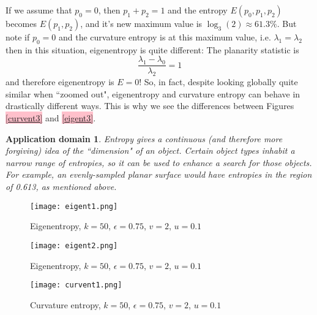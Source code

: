 \documentclass[a4paper,11pt,twoside]{article}
\newtheorem*{appdom}{Application domain}
\theoremstyle{definition}
\theoremstyle{remark}
\newcommand{\sh}[1]{\colorbox{pink}{#1}}
\newcommand{\lnk}[1]{\sh{\hyperref[#1]{\ref*{#1}}}}
\newenvironment{app}
   {\colorlet{shadecolor}{red!50}\begin{shaded}\begin{appdom}}
   {\end{appdom}\end{shaded}}
\begin{document}
If we assume that $p_0=0$, then $p_1+p_2=1$ and the entropy $E(p_0,p_1,p_2)$ becomes $E(p_1,p_2)$, and it's new maximum value is $\log_3(2)\approx 61.3\%$. But note if $p_0=0$ and the curvature entropy is at this maximum value, i.e. $\lambda_1=\lambda_2$ then in this situation, eigenentropy is quite different: The planarity statistic is 
\begin{displaymath}
\frac{\lambda_1-\lambda_0}{\lambda_2}=1
\end{displaymath}
and therefore eigenentropy is $E=0$! So, in fact, despite looking globally quite similar when ``zoomed out", eigenentropy and curvature entropy can behave in drastically different ways. This is why we see the differences between Figures \lnk{curvent3} and \lnk{eigent3}.
\begin{app}Entropy gives a continuous (and therefore more forgiving) idea of the ``dimension" of an object. Certain object types inhabit a narrow range of entropies, so it can be used to enhance a search for those objects. For example, an evenly-sampled planar surface would have entropies in the region of 0.613, as mentioned above.
\end{app}
\newpage
\begin{figure}[!h]
  \caption{Eigenentropy, $k = 50$, $\epsilon = 0.75$, $v = 2$, $u=0.1$}
  \centering
    \texttt{[image: eigent1.png]}
    \label{eigent1}
\end{figure}

\begin{figure}[!h]
  \caption{Eigenentropy, $k = 50$, $\epsilon = 0.75$, $v = 2$, $u=0.1$}
  \centering
    \texttt{[image: eigent2.png]}
    \label{eigent2}
\end{figure}
\newpage
\begin{figure}[!h]
  \caption{Curvature entropy, $k = 50$, $\epsilon = 0.75$, $v = 2$, $u=0.1$}
  \centering
    \texttt{[image: curvent1.png]}
    \label{curvent1}
\end{figure}
\end{document}
